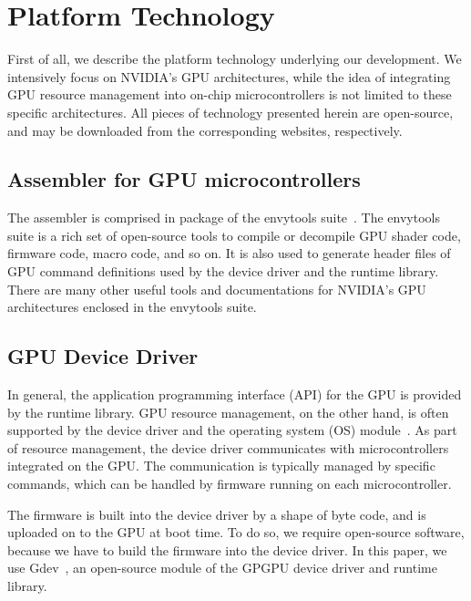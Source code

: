 
\section{Platform Technology}\label{sec:tech}

First of all, we describe the platform technology underlying our
development.
We intensively focus on NVIDIA's GPU architectures, while the idea of
integrating GPU resource management into on-chip microcontrollers is not
limited to these specific architectures.
All pieces of technology presented herein are open-source, and may be
downloaded from the corresponding websites, respectively.

\subsection{Assembler for GPU microcontrollers}\label{sec:envy}

The assembler is comprised in package of the envytools suite~\cite{envytools}.
The envytools suite is a rich set of open-source tools to compile or
decompile GPU shader code, firmware code, macro code, and so on. 
It is also used to generate header files of GPU command definitions used
by the device driver and the runtime library.
There are many other useful tools and documentations for NVIDIA's GPU
architectures enclosed in the envytools suite.

\subsection{GPU Device Driver}\label{sec:driver}

In general, the application programming interface (API) for the GPU is
provided by the runtime library.
GPU resource management, on the other hand, is often supported by the
device driver and the operating system (OS) module~\cite{Kato_ATC11,
Kato_ATC12, Bautin_MCNC08}.
As part of resource management, the device driver communicates with
microcontrollers integrated on the GPU.
The communication is typically managed by specific commands, which can
be handled by firmware running on each microcontroller.

\par
The firmware is built into the device driver by a shape of byte code,
and is uploaded on to the GPU at boot time.
To do so, we require open-source software, because we have to build the
firmware into the device driver.
In this paper, we use Gdev~\cite{Kato_ATC12}, an open-source module of
the GPGPU device driver and runtime library.

